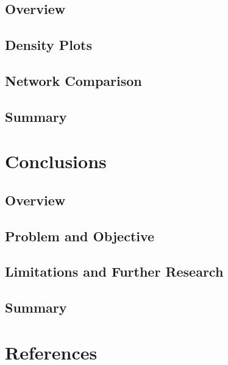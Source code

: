 \documentclass[fancy, masters,twoside]{byuthesis}
\newlength{\cslhangindent}
\newlength{\cslentryspacingunit} %
\newenvironment{CSLReferences}[2] %
 {%
  \setlength{\parindent}{0pt}
  \ifodd #1
  \let\oldpar\par
  \def\par{\hangindent=\cslhangindent\oldpar}
  \fi
  \setlength{\parskip}{#2\cslentryspacingunit}
 }%
 {}
\begin{document}
\hypertarget{overview-3}{%
\section{Overview}\label{overview-3}}

\hypertarget{density-plots}{%
\section{Density Plots}\label{density-plots}}

\hypertarget{network-comparison}{%
\section{Network Comparison}\label{network-comparison}}

\hypertarget{summary-3}{%
\section{Summary}\label{summary-3}}

\hypertarget{conclusions}{%
\chapter{Conclusions}\label{conclusions}}

\hypertarget{overview-4}{%
\section{Overview}\label{overview-4}}

\hypertarget{problem-and-objective}{%
\section{Problem and Objective}\label{problem-and-objective}}

\hypertarget{limitations-and-further-research}{%
\section{Limitations and Further Research}\label{limitations-and-further-research}}

\hypertarget{summary-4}{%
\section{Summary}\label{summary-4}}

\hypertarget{references}{%
\chapter*{References}\label{references}}

\pagestyle{myrefs}

\hypertarget{refs}{}
\begin{CSLReferences}{0}{0}
\end{CSLReferences}

\cleardoublepage
\pagestyle{byu}

%
\end{document}
